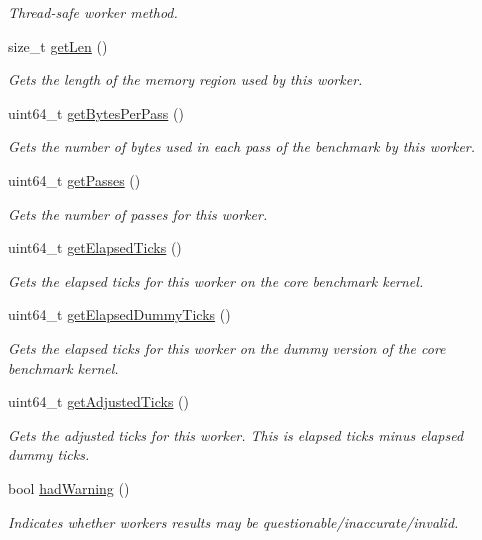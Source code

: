 \begin{DoxyCompactItemize}
\begin{DoxyCompactList}\small\item\em Thread-\/safe worker method. \end{DoxyCompactList}\item 
size\+\_\+t \hyperlink{classxmem_1_1benchmark_1_1_throughput_benchmark_worker_a65dfa53d591ebf85ee3d1dfdd7c98f20}{get\+Len} ()
\begin{DoxyCompactList}\small\item\em Gets the length of the memory region used by this worker. \end{DoxyCompactList}\item 
uint64\+\_\+t \hyperlink{classxmem_1_1benchmark_1_1_throughput_benchmark_worker_aa3c3f95c0dd92e82391135cc57e1ab1f}{get\+Bytes\+Per\+Pass} ()
\begin{DoxyCompactList}\small\item\em Gets the number of bytes used in each pass of the benchmark by this worker. \end{DoxyCompactList}\item 
uint64\+\_\+t \hyperlink{classxmem_1_1benchmark_1_1_throughput_benchmark_worker_afc7a394e6a04e4fe72d82db3ca47cd62}{get\+Passes} ()
\begin{DoxyCompactList}\small\item\em Gets the number of passes for this worker. \end{DoxyCompactList}\item 
uint64\+\_\+t \hyperlink{classxmem_1_1benchmark_1_1_throughput_benchmark_worker_acf9ec8195f85292cc744b89b3ab0e6cc}{get\+Elapsed\+Ticks} ()
\begin{DoxyCompactList}\small\item\em Gets the elapsed ticks for this worker on the core benchmark kernel. \end{DoxyCompactList}\item 
uint64\+\_\+t \hyperlink{classxmem_1_1benchmark_1_1_throughput_benchmark_worker_a301d7c1f0f7400a9f4a8a4be66969319}{get\+Elapsed\+Dummy\+Ticks} ()
\begin{DoxyCompactList}\small\item\em Gets the elapsed ticks for this worker on the dummy version of the core benchmark kernel. \end{DoxyCompactList}\item 
uint64\+\_\+t \hyperlink{classxmem_1_1benchmark_1_1_throughput_benchmark_worker_aac1a7f68313e877f4f73d212d00d5289}{get\+Adjusted\+Ticks} ()
\begin{DoxyCompactList}\small\item\em Gets the adjusted ticks for this worker. This is elapsed ticks minus elapsed dummy ticks. \end{DoxyCompactList}\item 
bool \hyperlink{classxmem_1_1benchmark_1_1_throughput_benchmark_worker_af44781eee1ae525ce94ec83da6e7595e}{had\+Warning} ()
\begin{DoxyCompactList}\small\item\em Indicates whether worker\textquotesingle{}s results may be questionable/inaccurate/invalid. \end{DoxyCompactList}\end{DoxyCompactItemize}
